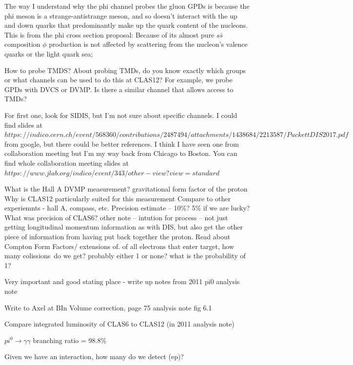         The way I understand why the phi channel probes the gluon GPDs is because the phi meson is a strange-antistrange meson, and so doesn't interact with the up and down quarks that predominantly make up the quark content of the nucleons. This is from the phi cross section proposal: Because of its almost pure $s\bar{s}$ composition $\phi$ production is not affected by scattering from the nucleon’s valence quarks or the light quark sea;
        
        How to probe TMDS?
        About probing TMDs, do you know exactly which groups or what channels can be used to do this at CLAS12? For example, we probe GPDs with DVCS or DVMP. Is there a similar channel that allows access to TMDs?
        
        For first one, look for SIDIS, but I'm not sure about specific channels. I could find slides at
        $https://indico.cern.ch/event/568360/contributions/2487494/attachments/1438684/2213587/PuckettDIS2017.pdf$ from google, but there could be better references. I think I have seen one from collaboration meeting but I'm my way back from Chicago to Boston. You can find whole collaboration meeting slides at $https://www.jlab.org/indico/event/343/other-view?view=standard$



    What is the Hall A DVMP measurement?
    gravitational form factor of the proton
    Why is CLAS12 particularly suited for this measurement
    Compare to other experiemnts - hall A, compass, etc. 
    Precision estimate – 10\%? 5\% if we are lucky? What was precision of CLAS6?
    other note – intution for process – not just getting longitudinal momentum information as with DIS, but also get the other piece of information from having put back together the proton. Read about Compton Form Factors/ extensions of. 
    of all electrons that enter target, how many colissions do we get? probably either 1 or none? what is the probability of 1?
    
    Very important and good stating place - write up notes from 2011 pi0 analysis note
    
    Write to Axel at BIn Volume correction, page 75 analysis note fig 6.1
    
    Compare integrated luminosity of CLAS6 to CLAS12 (in 2011 analysis note)
    
    $pi^0 \longrightarrow \gamma \gamma$ branching ratio = 98.8\%
    
    Given we have an interaction, how many do we detect (ep)?
    
